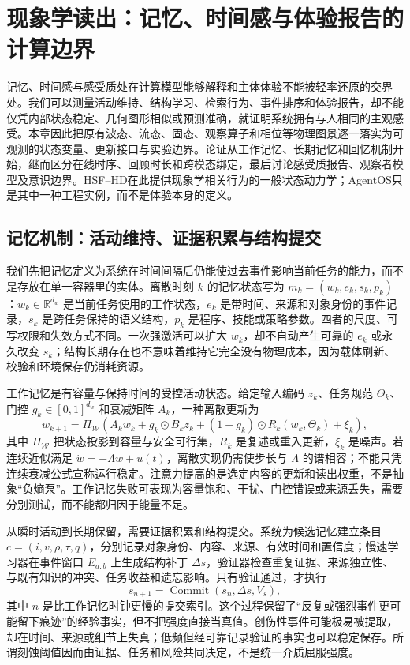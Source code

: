 \chapter{现象学读出：记忆、时间感与体验报告的计算边界}
\label{chp:phenomenological_physics}
记忆、时间感与感受质处在计算模型能够解释和主体体验不能被轻率还原的交界处。我们可以测量活动维持、结构学习、检索行为、事件排序和体验报告，却不能仅凭内部状态稳定、几何图形相似或预测准确，就证明系统拥有与人相同的主观感受。本章因此把原有波态、流态、固态、观察算子和相位等物理图景逐一落实为可观测的状态变量、更新接口与实验边界。论证从工作记忆、长期记忆和回忆机制开始，继而区分在线时序、回顾时长和跨模态绑定，最后讨论感受质报告、观察者模型及意识边界。HSF--HD在此提供现象学相关行为的一般状态动力学；AgentOS只是其中一种工程实例，而不是体验本身的定义。

\section{记忆机制：活动维持、证据积累与结构提交}
\label{sec:section_9311}
我们先把记忆定义为系统在时间间隔后仍能使过去事件影响当前任务的能力，而不是存放在单一容器里的实体。离散时刻 $k$ 的记忆状态写为 $m_k=(w_k,e_k,s_k,p_k)$：$w_k\in\mathbb R^{d_w}$ 是当前任务使用的工作状态，$e_k$ 是带时间、来源和对象身份的事件记录，$s_k$ 是跨任务保持的语义结构，$p_k$ 是程序、技能或策略参数。四者的尺度、可写权限和失效方式不同。一次强激活可以扩大 $w_k$，却不自动产生可靠的 $e_k$ 或永久改变 $s_k$；结构长期存在也不意味着维持它完全没有物理成本，因为载体刷新、校验和环境保存仍消耗资源。

工作记忆是有容量与保持时间的受控活动状态。给定输入编码 $z_k$、任务规范 $\Theta_k$、门控 $g_k\in[0,1]^{d_w}$ 和衰减矩阵 $A_k$，一种离散更新为
\[
w_{k+1}=\Pi_{\mathcal W}\!\left(A_k w_k+g_k\odot B_k z_k+(1-g_k)\odot R_k(w_k,\Theta_k)+\xi_k\right),
\]
其中 $\Pi_{\mathcal W}$ 把状态投影到容量与安全可行集，$R_k$ 是复述或重入更新，$\xi_k$ 是噪声。若连续近似满足 $\dot w=-\Lambda w+u(t)$，离散实现仍需使步长与 $\Lambda$ 的谱相容；不能只凭连续衰减公式宣称运行稳定。注意力提高的是选定内容的更新和读出权重，不是抽象“负熵泵”。工作记忆失败可表现为容量饱和、干扰、门控错误或来源丢失，需要分别测试，而不能都归因于能量不足。

从瞬时活动到长期保留，需要证据积累和结构提交。系统为候选记忆建立条目 $c=(i,v,\rho,\tau,q)$，分别记录对象身份、内容、来源、有效时间和置信度；慢速学习器在事件窗口 $E_{a:b}$ 上生成结构补丁 $\Delta s$，验证器检查重复证据、来源独立性、与既有知识的冲突、任务收益和遗忘影响。只有验证通过，才执行
\[
s_{n+1}=\operatorname{Commit}\!\left(s_n,\Delta s,V_s\right),
\]
其中 $n$ 是比工作记忆时钟更慢的提交索引。这个过程保留了“反复或强烈事件更可能留下痕迹”的经验事实，但不把强度直接当真值。创伤性事件可能极易被提取，却在时间、来源或细节上失真；低频但经可靠记录验证的事实也可以稳定保存。所谓刻蚀阈值因而由证据、任务和风险共同决定，不是统一介质屈服强度。

